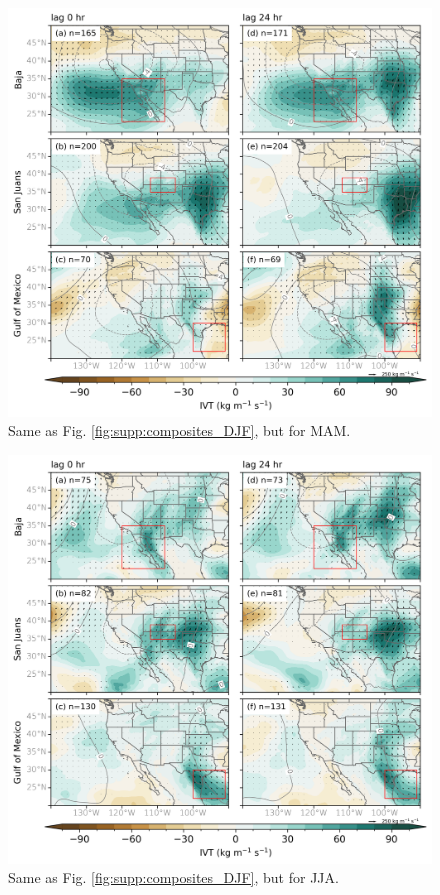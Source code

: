 \documentclass[draft,jgrga]{agutexSI2019}
\begin{document}
\begin{figure}
\noindent\includegraphics[width=\textwidth]{figS6.png}
\caption{Same as Fig. \ref{fig:supp:composites_DJF}, but for MAM.}
\label{fig:supp:composites_MAM}
\end{figure}

\begin{figure}
\noindent\includegraphics[width=\textwidth]{figS7.png}
\caption{Same as Fig. \ref{fig:supp:composites_DJF}, but for JJA.}
\label{fig:supp:composites_JJA}
\end{figure}
\end{document}
